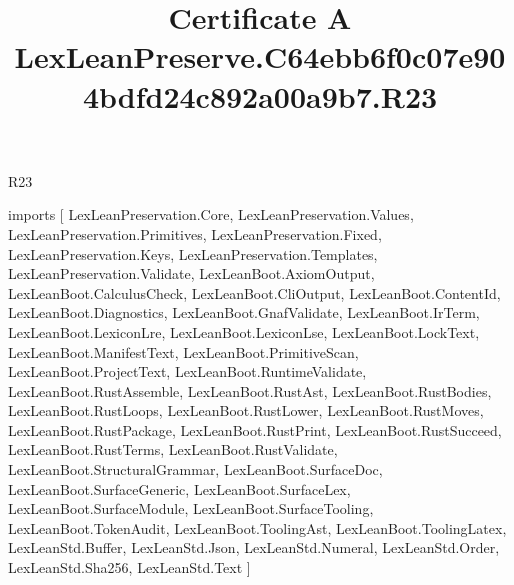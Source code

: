 \begin{lexlean}{R23}
\title{Certificate A LexLeanPreserve.C64ebb6f0c07e904bdfd24c892a00a9b7.R23}
\begin{coremodule}
imports [
  LexLeanPreservation.Core,
  LexLeanPreservation.Values,
  LexLeanPreservation.Primitives,
  LexLeanPreservation.Fixed,
  LexLeanPreservation.Keys,
  LexLeanPreservation.Templates,
  LexLeanPreservation.Validate,
  LexLeanBoot.AxiomOutput,
  LexLeanBoot.CalculusCheck,
  LexLeanBoot.CliOutput,
  LexLeanBoot.ContentId,
  LexLeanBoot.Diagnostics,
  LexLeanBoot.GnafValidate,
  LexLeanBoot.IrTerm,
  LexLeanBoot.LexiconLre,
  LexLeanBoot.LexiconLse,
  LexLeanBoot.LockText,
  LexLeanBoot.ManifestText,
  LexLeanBoot.PrimitiveScan,
  LexLeanBoot.ProjectText,
  LexLeanBoot.RuntimeValidate,
  LexLeanBoot.RustAssemble,
  LexLeanBoot.RustAst,
  LexLeanBoot.RustBodies,
  LexLeanBoot.RustLoops,
  LexLeanBoot.RustLower,
  LexLeanBoot.RustMoves,
  LexLeanBoot.RustPackage,
  LexLeanBoot.RustPrint,
  LexLeanBoot.RustSucceed,
  LexLeanBoot.RustTerms,
  LexLeanBoot.RustValidate,
  LexLeanBoot.StructuralGrammar,
  LexLeanBoot.SurfaceDoc,
  LexLeanBoot.SurfaceGeneric,
  LexLeanBoot.SurfaceLex,
  LexLeanBoot.SurfaceModule,
  LexLeanBoot.SurfaceTooling,
  LexLeanBoot.TokenAudit,
  LexLeanBoot.ToolingAst,
  LexLeanBoot.ToolingLatex,
  LexLeanStd.Buffer,
  LexLeanStd.Json,
  LexLeanStd.Numeral,
  LexLeanStd.Order,
  LexLeanStd.Sha256,
  LexLeanStd.Text
]


\end{coremodule}
\end{lexlean}
